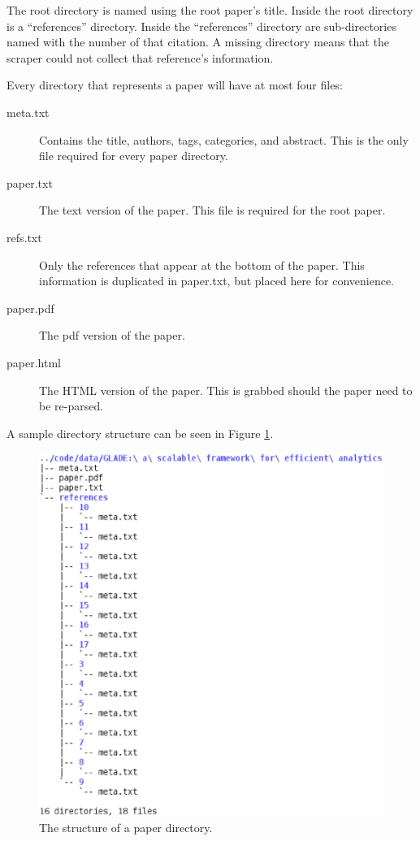 \documentclass[10pt, conference, compsocconf]{IEEEtran}
\begin{document}
The root directory is named using the root paper's title. Inside the root
directory is a ``references'' directory.  Inside the ``references'' directory
are sub-directories named with the number of that citation. A missing directory
means that the scraper could not collect that reference's information.

Every directory that represents a paper will have at most four files:
\begin{description}
   \item[meta.txt] Contains the title, authors, tags, categories, and abstract.
                   This is the only file required for every paper directory.
   \item[paper.txt] The text version of the paper. This file is required for
                    the root paper.
   \item[refs.txt] Only the references that appear at the bottom of the paper.
                   This information is duplicated in paper.txt, but placed here
                   for convenience.
   \item[paper.pdf] The pdf version of the paper.
   \item[paper.html] The HTML version of the paper. This is grabbed should
                     the paper need to be re-parsed.
\end{description}


A sample directory structure can be seen in Figure \ref{fig:tree}.

\begin{figure}[ht]
   \includegraphics[width=\columnwidth]{images/tree.eps}
        \caption{The structure of a paper directory.}
        \label{fig:tree}
\end{figure}
\end{document}
